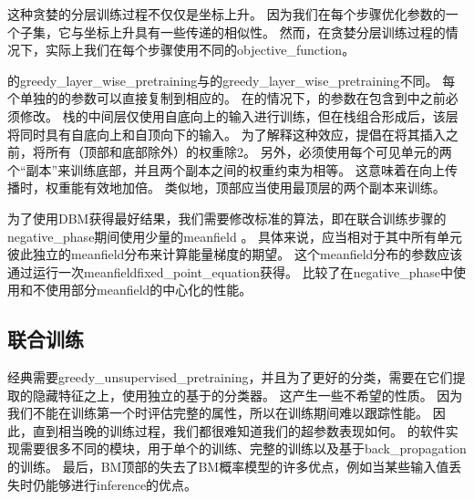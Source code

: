 
这种贪婪的分层训练过程不仅仅是坐标上升。
因为我们在每个步骤优化参数的一个子集，它与坐标上升具有一些传递的相似性。
然而，在贪婪分层训练过程的情况下，实际上我们在每个步骤使用不同的\gls{objective_function}。

的\gls{greedy_layer_wise_pretraining}与的\gls{greedy_layer_wise_pretraining}不同。
每个单独的的参数可以直接复制到相应的。
在的情况下，的参数在包含到中之前必须修改。
栈的中间层仅使用自底向上的输入进行训练，但在栈组合形成后，该层将同时具有自底向上和自顶向下的输入。
为了解释这种效应，\citet{SalHinton09}提倡在将其插入之前，将所有（顶部和底部除外）的权重除2。
另外，必须使用每个可见单元的两个``副本''来训练底部，并且两个副本之间的权重约束为相等。
这意味着在向上传播时，权重能有效地加倍。
类似地，顶部应当使用最顶层的两个副本来训练。

为了使用\gls{DBM}获得最好结果，我们需要修改标准的算法，即在联合训练步骤的\gls{negative_phase}期间使用少量的\gls{meanfield} \citep{SalHinton09}。
具体来说，应当相对于其中所有单元彼此独立的\gls{meanfield}分布来计算能量梯度的期望。
这个\gls{meanfield}分布的参数应该通过运行一次\gls{meanfield}\gls{fixed_point_equation}获得。
\citet{Goodfellow-et-al-NIPS2013}比较了在\gls{negative_phase}中使用和不使用部分\gls{meanfield}的中心化的性能。


\subsection{联合训练}
\label{sec:jointly_training_deep_boltzmann_machines}

经典需要\gls{greedy_unsupervised_pretraining}，并且为了更好的分类，需要在它们提取的隐藏特征之上，使用独立的基于的分类器。
这产生一些不希望的性质。
因为我们不能在训练第一个时评估完整的属性，所以在训练期间难以跟踪性能。
因此，直到相当晚的训练过程，我们都很难知道我们的超参数表现如何。
的软件实现需要很多不同的模块，用于单个的训练、完整的训练以及基于\gls{back_propagation}的训练。
最后，\gls{BM}顶部的失去了\gls{BM}概率模型的许多优点，例如当某些输入值丢失时仍能够进行\gls{inference}的优点。

